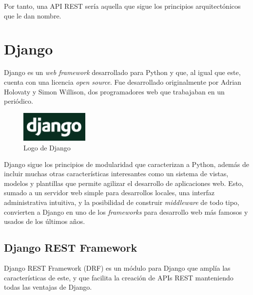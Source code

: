 Por tanto, una API REST sería aquella que sigue los principios arquitectónicos que le dan nombre.


\section{Django}\label{sec:django}

Django es un \emph{web framework} desarrollado para Python y que, al igual que este, cuenta con una licencia \emph{open source}. Fue desarrollado originalmente por Adrian Holovaty y Simon Willison, dos programadores web que trabajaban en un periódico. \emph{\parencite{Reference4}}

\begin{figure}[ht]
    \centering
    \includegraphics[width=0.3\textwidth]{Figures/django-logo}
    \decoRule
    \caption[Django (Logo)]{Logo de Django \emph{\parencite{Reference5}}}
    \label{fig:django-logo}
\end{figure}

Django sigue los principios de modularidad que caracterizan a Python, además de incluir muchas otras características interesantes como un sistema de vistas, modelos y plantillas que permite agilizar el desarrollo de aplicaciones web. Esto, sumado a un servidor web simple para desarrollos locales, una interfaz administrativa intuitiva, y la posibilidad de construir \emph{middleware} de todo tipo, convierten a Django en uno de los \emph{frameworks} para desarrollo web más famosos y usados de los últimos años. \emph{\parencite{Reference4}}

\subsection{Django REST Framework}

Django REST Framework (DRF) es un módulo para Django que amplía las características de este, y que facilita la creación de APIs REST manteniendo todas las ventajas de Django. \emph{\parencite{Reference7}}

